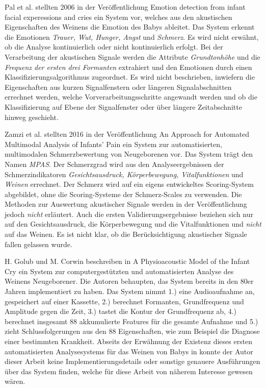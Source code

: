 Pal et al. stellten 2006 in der Veröffentlichung \glqq Emotion detection from infant facial experessions and cries\grqq{} \cite{palEmotion} ein System vor, welches aus den akustischen Eigenschaften des Weinens die Emotion des Babys ableitet. Das System erkennt die Emotionen \emph{Trauer, Wut, Hunger, Angst} und \emph{Schmerz}. Es wird nicht erwähnt, ob die Analyse kontinuierlich oder nicht kontinuierlich erfolgt. Bei der Verarbeitung der akustischen Signale werden die Attribute \emph{Grundtonhöhe} und die \emph{Frequenz der ersten drei Formanten} extrahiert und den Emotionen durch einen Klassifizierungsalgorithmus zugeordnet. Es wird nicht beschrieben, inwiefern die Eigenschaften aus kurzen Signalfenstern oder längeren Signalabschnitten errechnet werden, welche Vorverarbeitungsschritte angewandt werden und ob die Klassifizierung auf Ebene der Signalfenster oder über längere Zeitabschnitte hinweg geschieht.

Zamzi et al. stellten 2016 in der Veröffentlichung \glqq An Approach for Automated Multimodal Analysis of Infants' Pain\grqq{} \cite{zamziMultimodal} ein System zur automatisierten, multimodalen Schmerzbewertung von Neugeborenen vor. Das System trägt den Namen \emph{MPAS}. Der Schmerzgrad wird aus den Analyseergebnissen der Schmerzindikatoren  \emph{Gesichtsausdruck, Körperbewegung, Vitalfunktionen} und \emph{Weinen} errechnet. Der Schmerz wird auf ein eigens entwickeltes Scoring-System abgebildet, ohne die Scoring-Systeme der Schmerz-Scales zu verwenden. Die Methoden zur Auswertung akustischer Signale werden in der Veröffentlichung jedoch \emph{nicht} erläutert. Auch die ersten Validierungsergebnisse beziehen sich nur auf den Gesichtsausdruck, die Körperbewegung und die Vitalfunktionen und \emph{nicht} auf das Weinen. Es ist nicht klar, ob die Berücksichtigung akustischer Signale fallen gelassen wurde.

H. Golub und M. Corwin beschreiben in \glqq A Physioacoustic Model of the Infant Cry\grqq{} \cite{cryModel} ein System zur computergestützten und automatisierten Analyse des Weinens Neugeborener. Die Autoren behaupten, das System bereits in den 80er Jahren implementiert zu haben. Das System nimmt 1.) eine Audioaufnahme an, gespeichert auf einer Kassette, 2.) berechnet Formanten, Grundfrequenz und Amplitude gegen die Zeit, 3.) tastet die Kontur der Grundfrequenz ab, 4.) berechnet insgesamt 88 akkumulierte Features für die gesamte Aufnahme und 5.) zieht Schlussfolgerungen aus den 88 Eigenschaften, wie zum Beispiel die Diagnose einer bestimmten Krankheit.\cite[S. 75 - 76]{cryModel} Abseits der Erwähnung der Existenz dieses ersten automatisierten Analysesystems für das Weinen von Babys in \cite{cryModel} konnte der Autor dieser Arbeit keine Implementierungsdetails oder sonstige genauere Ausführungen über das System finden, welche für diese Arbeit von näherem Interesse gewesen wären.


